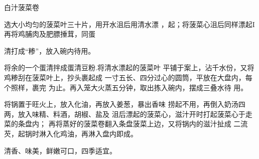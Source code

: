 \begin{recipe}{白汁菠菜卷}

\ingredients


\cooking

\step 选大小均匀的菠菜叶三十片，用开水沮后用清水漂 ，起；将菠菜心沮后同样漂起I再将鸡脯肉及肥膘捶茸，同蛋

清打成“糁”，放入碗内待用。

\step 将余的一个蛋清拌成蛋清豆粉.将清水漂起的菠菜叶 平铺于案上，沾千水份，又将鸡糁刮在菠菜叶上，抄头裹起成 一寸五长、四分过心的圆筒，平放在大盘内，每个照样，裹完 为止。再入笼大火蒸五分钟，取出拣入碗内，摆成三叠水待 用。

\step 将锅置于旺火上，放入化油，再放入姜葱，暴出香味 捞起不用，再倒入奶汤四两，放入味精、料酒，胡椒、盐及 沮后漂起的菠菜心，滋汁开时打起菠菜心于走菜的条盘内； 再将蒸好的菠菜卷翻入条盘菠菜上边，又将锅内的滋汁扯成 二流芡，起锅时淋入化鸡油，再淋入盘内即成。

\notes

清香、味美，鲜嫩可口，四季适宜。

\end{recipe}

